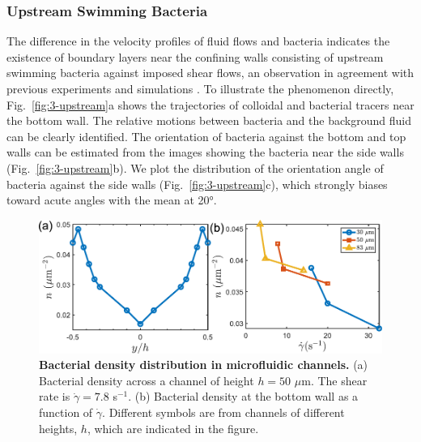 \subsubsection{Upstream Swimming Bacteria}
The difference in the velocity profiles of fluid flows and bacteria indicates the existence of boundary layers near the confining walls consisting of upstream swimming bacteria against imposed shear flows, an observation in agreement with previous experiments \cite{Hill2007, Kaya2012} and simulations \cite{Costanzo2012, Chilukuri2014, Ezhilan2015, Nash2010}. To illustrate the phenomenon directly, Fig.~\ref{fig:3-upstream}a shows the trajectories of colloidal and bacterial tracers near the bottom wall. The relative motions between bacteria and the background fluid can be
clearly identified. The orientation of bacteria against the bottom and top walls can be estimated from the images showing the bacteria near the side walls (Fig.~\ref{fig:3-upstream}b). We plot the distribution of the orientation angle of bacteria against the side walls (Fig.~\ref{fig:3-upstream}c), which strongly biases toward acute angles with the mean at 20°.

\begin{figure}[!ht]
	\begin{center}
	\includegraphics[width=5.5 in]{Figs/3-Rheo/5.pdf}
	\end{center}
	\caption[Bacterial Density Distribution in Microfluidic Channels]
	{
	\textbf{Bacterial density distribution in microfluidic channels.}
   (a) Bacterial density across a channel of height $h = 50$ $\mu$m. The shear rate is $\dot\gamma = 7.8$ s$^{-1}$. (b) Bacterial density at the bottom wall as a function of $\dot\gamma$. Different symbols are from channels of different heights, $h$, which are indicated in the figure.
	}
	\label{fig:3-density}
\end{figure}

